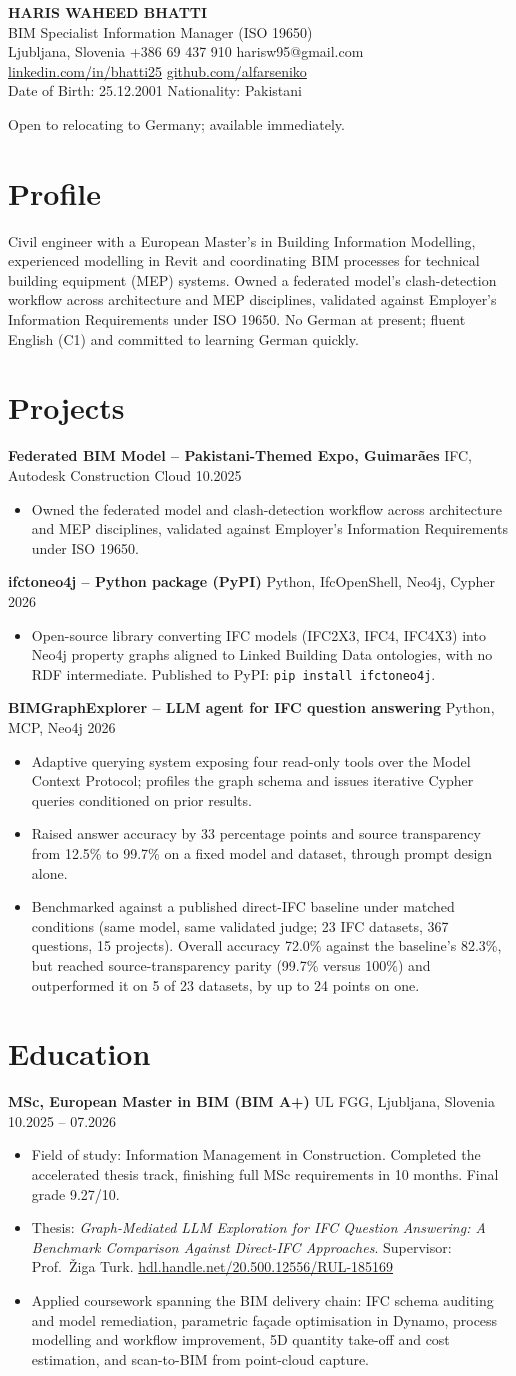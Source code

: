 \documentclass[a4paper,10.5pt]{article}
\newcommand{\datefill}{\dotfill}
\newcommand{\entry}[3]{\vspace{2.5pt}\noindent\textbf{#1} \textbar{} #2 \datefill{} #3\par\vspace{0.5pt}}
\newcommand{\ROLELINE}{BIM Specialist \textbar{} Information Manager (ISO 19650)}
\newcommand{\projIfcToNeo}{%
\entry{ifctoneo4j -- Python package (PyPI)}{Python, IfcOpenShell, Neo4j, Cypher}{2026}
\begin{itemize}
  \item Open-source library converting IFC models (IFC2X3, IFC4, IFC4X3) into Neo4j
        property graphs aligned to Linked Building Data ontologies, with no RDF
        intermediate. Published to PyPI: \texttt{pip install ifctoneo4j}.
\end{itemize}}
\newcommand{\projBIMGraph}{%
\entry{BIMGraphExplorer -- LLM agent for IFC question answering}{Python, MCP, Neo4j}{2026}
\begin{itemize}
  \item Adaptive querying system exposing four read-only tools over the Model
        Context Protocol; profiles the graph schema and issues iterative Cypher
        queries conditioned on prior results.
  \item Raised answer accuracy by 33 percentage points and source transparency from
        12.5\% to 99.7\% on a fixed model and dataset, through prompt design alone.
  \item Benchmarked against a published direct-IFC baseline under matched
        conditions (same model, same validated judge; 23 IFC datasets, 367
        questions, 15 projects). Overall accuracy 72.0\% against the baseline's
        82.3\%, but reached source-transparency parity (99.7\% versus 100\%) and
        outperformed it on 5 of 23 datasets, by up to 24 points on one.
\end{itemize}}
\newcommand{\projGuimaraes}{%
\entry{Federated BIM Model -- Pakistani-Themed Expo, Guimar\~aes}{IFC, Autodesk Construction Cloud}{10.2025}
\begin{itemize}
  \item Owned the federated model and clash-detection workflow across architecture
        and MEP disciplines, validated against Employer's Information Requirements
        under ISO 19650.
\end{itemize}}
\begin{document}
\begin{center}
  {\LARGE\bfseries HARIS WAHEED BHATTI}\\[2pt]
  {\large \ROLELINE}\\[3pt]
  Ljubljana, Slovenia \textbar{} +386 69 437 910 \textbar{} harisw95@gmail.com\\
  \href{https://linkedin.com/in/bhatti25}{linkedin.com/in/bhatti25} \textbar{}
  \href{https://github.com/alfarseniko}{github.com/alfarseniko}\\
  Date of Birth: 25.12.2001 \textbar{} Nationality: Pakistani
\end{center}
\vspace{-4pt}
\noindent\small Open to relocating to Germany; available immediately.\normalsize

\section{Profile}

\noindent Civil engineer with a European Master's in Building Information Modelling,
experienced modelling in Revit and coordinating BIM processes for technical building
equipment (MEP) systems. Owned a federated model's clash-detection workflow across
architecture and MEP disciplines, validated against Employer's Information
Requirements under ISO 19650. No German at present; fluent English (C1) and
committed to learning German quickly.

\section{Projects}

 \projGuimaraes \projIfcToNeo \projBIMGraph

\section{Education}
\entry{MSc, European Master in BIM (BIM A+)}{UL FGG, Ljubljana, Slovenia}{10.2025 -- 07.2026}
\begin{itemize}
  \item Field of study: Information Management in Construction. Completed the
        accelerated thesis track, finishing full MSc requirements in 10 months.
        Final grade 9.27/10.
  \item Thesis: \textit{Graph-Mediated LLM Exploration for IFC Question Answering:
        A Benchmark Comparison Against Direct-IFC Approaches}. Supervisor:
        Prof.~\v{Z}iga Turk. \href{http://hdl.handle.net/20.500.12556/RUL-185169}{hdl.handle.net/20.500.12556/RUL-185169}
  \item Applied coursework spanning the BIM delivery chain: IFC schema auditing and model remediation, parametric façade optimisation in Dynamo, process modelling and workflow improvement, 5D quantity take-off and cost estimation, and scan-to-BIM from point-cloud capture.
\end{itemize}
\end{document}
